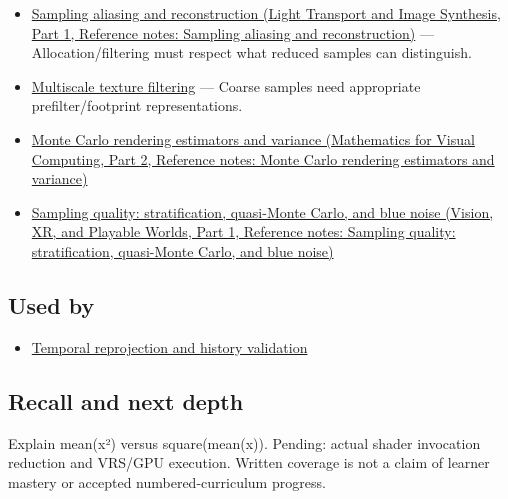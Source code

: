 \hypertarget{appendix-4192b2bdd21e-prerequisites}{}

\begin{itemize}
\tightlist
\item
  \href{../04-Light-Transport-and-Image-Synthesis-P01/main.pdf\#appendix-6a7869dd79a6}{Sampling aliasing and reconstruction (Light Transport and Image Synthesis, Part 1, Reference notes: Sampling aliasing and reconstruction)} --- Allocation/filtering must respect what reduced samples can distinguish.
\item
  \hyperref[appendix-b677a85ba76f]{Multiscale texture filtering} --- Coarse samples need appropriate prefilter/footprint representations.
\item
  \href{../02-Mathematics-for-Visual-Computing-P02/main.pdf\#appendix-031e02bf28af}{Monte Carlo rendering estimators and variance (Mathematics for Visual Computing, Part 2, Reference notes: Monte Carlo rendering estimators and variance)}
\item
  \href{../07-Vision-XR-and-Playable-Worlds-P01/main.pdf\#appendix-9f693ffd82bc}{Sampling quality: stratification, quasi-Monte Carlo, and blue noise (Vision, XR, and Playable Worlds, Part 1, Reference notes: Sampling quality: stratification, quasi-Monte Carlo, and blue noise)}
\end{itemize}

\subsection{Used by}\label{appendix-4192b2bdd21e-used-by}

\hypertarget{appendix-4192b2bdd21e-used-by}{}

\begin{itemize}
\tightlist
\item
  \hyperref[appendix-0727340a4428]{Temporal reprojection and history validation}
\end{itemize}

\subsection{Recall and next depth}\label{appendix-4192b2bdd21e-recall-and-next-depth}

\hypertarget{appendix-4192b2bdd21e-recall-and-next-depth}{}

Explain mean(x²) versus square(mean(x)). Pending: actual shader invocation reduction and VRS/GPU execution. Written coverage is not a claim of learner mastery or accepted numbered-curriculum progress.

